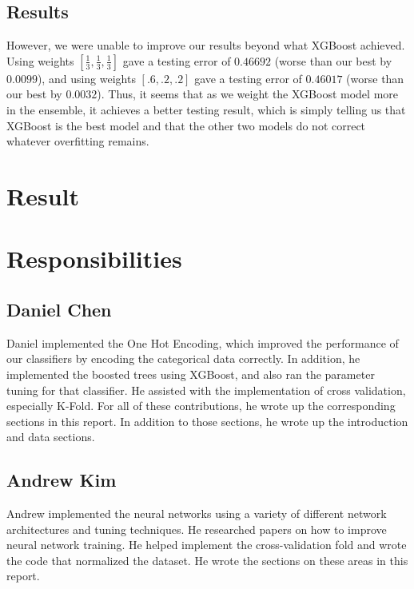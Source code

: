 \documentclass[twoside,11pt]{article}
\theoremstyle{definition}
\begin{document}
  \subsection{Results}
  However, we were unable to improve our results beyond what XGBoost achieved. Using weights $[\frac{1}{3}, \frac{1}{3}, \frac{1}{3}]$ gave a testing error of $0.46692$ (worse than our best by $0.0099$), and using weights $[.6, .2, .2]$ gave a testing error of $0.46017$ (worse than our best by $0.0032$). Thus, it seems that as we weight the XGBoost model more in the ensemble, it achieves a better testing result, which is simply telling us that XGBoost is the best model and that the other two models do not correct whatever overfitting remains.

\section{Result}

\section{Responsibilities}

  \subsection{Daniel Chen}
    Daniel implemented the One Hot Encoding, which improved the performance of our classifiers by encoding the categorical data correctly. In addition, he implemented the boosted trees using XGBoost, and also ran the parameter tuning for that classifier. He assisted with the implementation of cross validation, especially K-Fold. For all of these contributions, he wrote up the corresponding sections in this report. In addition to those sections, he wrote up the introduction and data sections.

  \subsection{Andrew Kim}
    Andrew implemented the neural networks using a variety of different network architectures and tuning techniques. He researched papers on how to improve neural network training. He helped implement the cross-validation fold and wrote the code that normalized the dataset. He wrote the sections on these areas in this report. 
\end{document}
